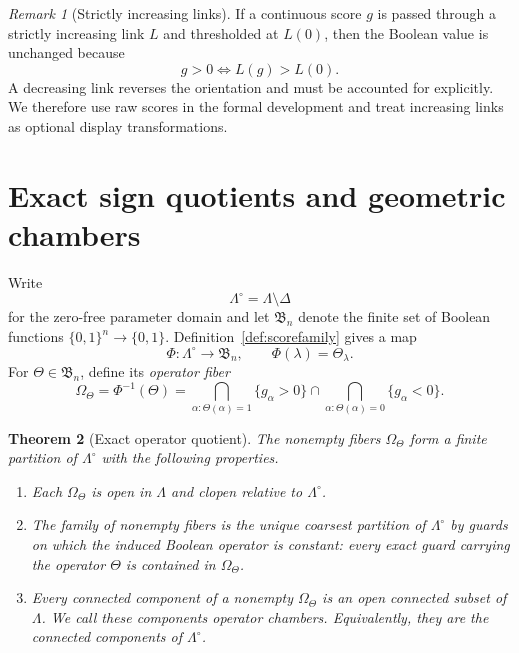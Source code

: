 \documentclass[11pt]{article}
\newtheorem{theorem}{Theorem}[section]
\theoremstyle{definition}
\theoremstyle{remark}
\newtheorem{remark}[theorem]{Remark}
\newcommand{\B}{\{0,1\}}
\newcommand{\Deltaop}{\Delta}
\begin{document}
\begin{remark}[Strictly increasing links]
If a continuous score $g$ is passed through a strictly increasing link $L$ and thresholded at $L(0)$, then the Boolean value is unchanged because
\[
 g>0\iff L(g)>L(0).
\]
A decreasing link reverses the orientation and must be accounted for explicitly. We therefore use raw scores in the formal development and treat increasing links as optional display transformations.
\end{remark}

\section{Exact sign quotients and geometric chambers}\label{sec:atlas}

Write
\[
 \Lambda^\circ=\Lambda\setminus\Deltaop
\]
for the zero-free parameter domain and let $\mathfrak B_n$ denote the finite set of Boolean functions $\B^n\to\B$. Definition~\ref{def:scorefamily} gives a map
\[
 \Phi:\Lambda^\circ\longrightarrow\mathfrak B_n,
 \qquad \Phi(\lambda)=\Theta_\lambda.
\]
For $\Theta\in\mathfrak B_n$, define its \emph{operator fiber}
\begin{equation}\label{eq:operatorfiber}
 \Omega_\Theta
 =\Phi^{-1}(\Theta)
 =\bigcap_{\alpha:\Theta(\alpha)=1}\{g_\alpha>0\}
  \cap
  \bigcap_{\alpha:\Theta(\alpha)=0}\{g_\alpha<0\}.
\end{equation}

\begin{theorem}[Exact operator quotient]\label{thm:atlas}
The nonempty fibers $\Omega_\Theta$ form a finite partition of $\Lambda^\circ$ with the following properties.
\begin{enumerate}[label=(\roman*),leftmargin=2.2em]
\item Each $\Omega_\Theta$ is open in $\Lambda$ and clopen relative to $\Lambda^\circ$.
\item The family of nonempty fibers is the unique coarsest partition of $\Lambda^\circ$ by guards on which the induced Boolean operator is constant: every exact guard carrying the operator $\Theta$ is contained in $\Omega_\Theta$.
\item Every connected component of a nonempty $\Omega_\Theta$ is an open connected subset of $\Lambda$. We call these components \emph{operator chambers}. Equivalently, they are the connected components of $\Lambda^\circ$.
\end{enumerate}
\end{theorem}
\end{document}
